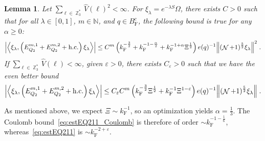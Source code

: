 \documentclass[12pt,a4paper]{article}
\numberwithin{equation}{section}
\newcommand{\NNN}{\mathbb{N}}
\newcommand{\1}{\mathbb{I}}
\newcommand{\F}{\mathrm{F}}
\DeclareMathOperator{\Z}{\mathbb{Z}}
\DeclareMathOperator{\NN}{\mathcal{N}}
\newcommand{\half}{\frac{1}{2}}
\newcommand{\eva}[1]{\left\langle #1 \right\rangle}
\theoremstyle{plain}
\newtheorem{lemma}[theorem]{Lemma}
\theoremstyle{definition}
\theoremstyle{remark}
\theoremstyle{plain}
\theoremstyle{definition}
\theoremstyle{remark}
\begin{document}
\begin{lemma} \label{lem:EQ211}
Let $ \sum_{\ell \in \Z_3^*} \hat{V}(\ell)^2 < \infty $. For $\xi_\lambda = e^{-\lambda S} \Omega$, there exists $ C > 0 $ such that for all $ \lambda \in [0,1] $, $ m \in \NNN $, and $ q \in B_{\F}^c $, the following bound is true for any $ \alpha \ge 0 $:
\begin{align}
	\abs{\eva{\xi_\lambda,\left(E^{m,1}_{Q_2}+E^{m,2}_{Q_2}+\mathrm{h.c.}\right) \xi_\lambda }}
	\leq C^m \left( k_{\F}^{-\frac 32}
		+ k_{\F}^{-1-\frac{\alpha}{2}} 
		+ k_{\F}^{-1+\alpha} \Xi^{\half} \right) e(q)^{-1}
		\norm { (\NN+1)^{\frac 52} \xi_\lambda }^2 \;. \label{eq:estEQ211_Coulomb}
\end{align}
If $ \sum_{\ell \in \Z_3^*} \hat{V}(\ell) < \infty $, given $ \varepsilon > 0 $, there exists $ C_\varepsilon > 0 $ such that we have the even better bound
\begin{align}
	\abs{\eva{\xi_\lambda,\left(E^{m,1}_{Q_2}+E^{m,2}_{Q_2}+\mathrm{h.c.}\right) \xi_\lambda }}
	\leq C_\varepsilon C^m \left( k_{\F}^{-\frac{3}{2}} \Xi^\half 
		+ k_{\F}^{-1}\Xi^{1-\varepsilon} \right) e(q)^{-1} 
		\norm { (\NN+1)^{\frac 52} \xi_\lambda } \;. \label{eq:estEQ211}
\end{align}
\end{lemma}

\textcolor{green!30!black}{As mentioned above, we expect $ \Xi \sim k_{\F}^{-1} $, so an optimization yields $ \alpha = \frac 13 $. The Coulomb bound~\eqref{eq:estEQ211_Coulomb} is therefore of order $ \sim k_{\F}^{-1-\frac 16} $, whereas~\eqref{eq:estEQ211} is $ \sim k_{\F}^{-2 + \varepsilon} $.}
\end{document}

